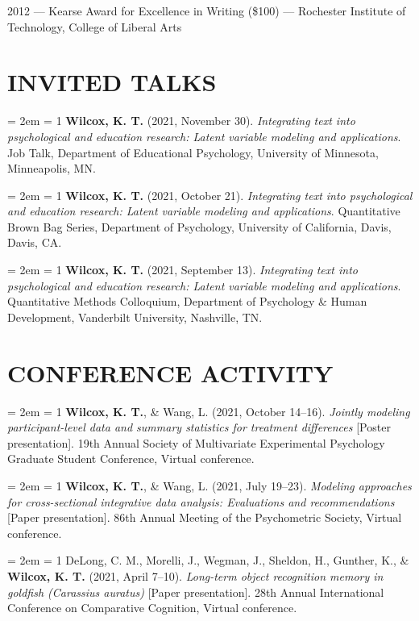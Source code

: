 \documentclass[
  12 pt,
]{article}
\begin{document}
2012 --- Kearse Award for Excellence in Writing (\$100) --- Rochester
Institute of Technology, College of Liberal Arts

\hypertarget{invited-talks}{%
\section{INVITED TALKS}\label{invited-talks}}

\hangindent = 2em \hangafter = 1 \textbf{Wilcox, K. T.} (2021, November
30). \emph{Integrating text into psychological and education research:
Latent variable modeling and applications}. Job Talk, Department of
Educational Psychology, University of Minnesota, Minneapolis, MN.

\hangindent = 2em \hangafter = 1 \textbf{Wilcox, K. T.} (2021, October
21). \emph{Integrating text into psychological and education research:
Latent variable modeling and applications}. Quantitative Brown Bag
Series, Department of Psychology, University of California, Davis,
Davis, CA.

\hangindent = 2em \hangafter = 1 \textbf{Wilcox, K. T.} (2021, September
13). \emph{Integrating text into psychological and education research:
Latent variable modeling and applications}. Quantitative Methods
Colloquium, Department of Psychology \& Human Development, Vanderbilt
University, Nashville, TN.

\hypertarget{conference-activity}{%
\section{CONFERENCE ACTIVITY}\label{conference-activity}}

\hangindent = 2em \hangafter = 1 \textbf{Wilcox, K. T.}, \& Wang, L.
(2021, October 14--16). \emph{Jointly modeling participant-level data
and summary statistics for treatment differences} {[}Poster
presentation{]}. 19th Annual Society of Multivariate Experimental
Psychology Graduate Student Conference, Virtual conference.

\hangindent = 2em \hangafter = 1 \textbf{Wilcox, K. T.}, \& Wang, L.
(2021, July 19--23). \emph{Modeling approaches for cross-sectional
integrative data analysis: Evaluations and recommendations} {[}Paper
presentation{]}. 86th Annual Meeting of the Psychometric Society,
Virtual conference.

\hangindent = 2em \hangafter = 1 DeLong, C. M., Morelli, J., Wegman, J.,
Sheldon, H., Gunther, K., \& \textbf{Wilcox, K. T.} (2021, April 7--10).
\emph{Long-term object recognition memory in goldfish (Carassius
auratus)} {[}Paper presentation{]}. 28th Annual International Conference
on Comparative Cognition, Virtual conference.
\end{document}
